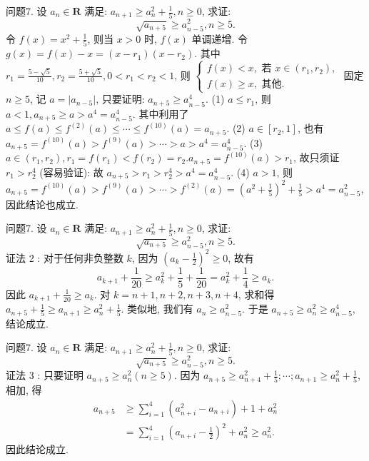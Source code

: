 问题7. 设 $a_n \in \mathbf{R}$ 满足: $a_{n+1} \geqslant a_n^2+\frac{1}{5}, n \geqslant 0$, 求证:
$$
\sqrt{a_{n+5}} \geqslant a_{n-5}^2, n \geqslant 5 .
$$
令 $f(x)=x^2+\frac{1}{5}$, 则当 $x>0$ 时, $f(x)$ 单调递增.
令 $g(x)=f(x)- x=\left(x-r_1\right)\left(x-r_2\right)$. 其中 $r_1=\frac{5-\sqrt{5}}{10}, r_2=\frac{5+\sqrt{5}}{10}, 0<r_1<r_2<1$, 则 $\left\{\begin{array}{l}f(x)<x, \text { 若 } x \in\left(r_1, r_2\right) , \\ f(x) \geqslant x, \text { 其他.
}\end{array}\right.$
固定 $n \geqslant 5$, 记 $a=\left|a_{n-5}\right|$, 只要证明: $a_{n+5} \geqslant a_{n-5}^4$.
(1) $a \leqslant r_1$, 则 $a<1, a_{n+5} \geqslant a>a^4=a_{n-5}^4$.
其中利用了 $a \leqslant f(a) \leqslant f^{(2)}(a) \leqslant \cdots \leqslant f^{(10)}(a)=a_{n+5}$.
(2) $a \in\left[r_2, 1\right]$, 也有 $a_{n+5}=f^{(10)}(a)>f^{(9)}(a)>\cdots>a>a^4=a_{n-5}^4$.
(3) $a \in\left(r_1, r_2\right), r_1=f\left(r_1\right)<f\left(r_2\right)=r_2 . a_{n+5}=f^{(10)}(a)>r_1$, 故只须证 $r_1>r_2^4$ (容易验证):
故 $a_{n+5}>r_1>r_2^4>a^4=a_{n-5}^4$.
(4) $a>1$, 则 $a_{n+5}=f^{(10)}(a)>f^{(9)}(a)>\cdots>f^{(2)}(a)=\left(a^2+\frac{1}{5}\right)^2+ \frac{1}{5}>a^4=a_{n-5}^2$, 因此结论也成立.



问题7. 设 $a_n \in \mathbf{R}$ 满足: $a_{n+1} \geqslant a_n^2+\frac{1}{5}, n \geqslant 0$, 求证:
$$
\sqrt{a_{n+5}} \geqslant a_{n-5}^2, n \geqslant 5 .
$$
证法 2 : 对于任何非负整数 $k$, 因为 $\left(a_k-\frac{1}{2}\right)^2 \geqslant 0$, 故有
$$
a_{k+1}+\frac{1}{20} \geqslant a_k^2+\frac{1}{5}+\frac{1}{20}=a_k^2+\frac{1}{4} \geqslant a_k .
$$
因此 $a_{k+1}+\frac{1}{20} \geqslant a_k$.
对 $k=n+1, n+2, n+3, n+4$, 求和得 $a_{n+5}+\frac{1}{5} \geqslant a_{n+1} \geqslant a_n^2+\frac{1}{5}$.
类似地, 我们有 $a_n \geqslant a_{n-5}^2$. 于是 $a_{n+5} \geqslant a_n^2 \geqslant a_{n-5}^4$, 结论成立.



问题7. 设 $a_n \in \mathbf{R}$ 满足: $a_{n+1} \geqslant a_n^2+\frac{1}{5}, n \geqslant 0$, 求证:
$$
\sqrt{a_{n+5}} \geqslant a_{n-5}^2, n \geqslant 5 .
$$
证法 3 : 只要证明 $a_{n+5} \geqslant a_n^2(n \geqslant 5)$.
因为 $a_{n+5} \geqslant a_{n+4}^2+\frac{1}{5} ; \cdots ; a_{n+1} \geqslant a_n^2+\frac{1}{5}$, 相加, 得
$$
\begin{aligned}
a_{n+5} & \geqslant \sum_{i=1}^4\left(a_{n+i}^2-a_{n+i}\right)+1+a_n^2 \\
& =\sum_{i=1}^4\left(a_{n+i}-\frac{1}{2}\right)^2+a_n^2 \geqslant a_n^2 .
\end{aligned}
$$
因此结论成立.



